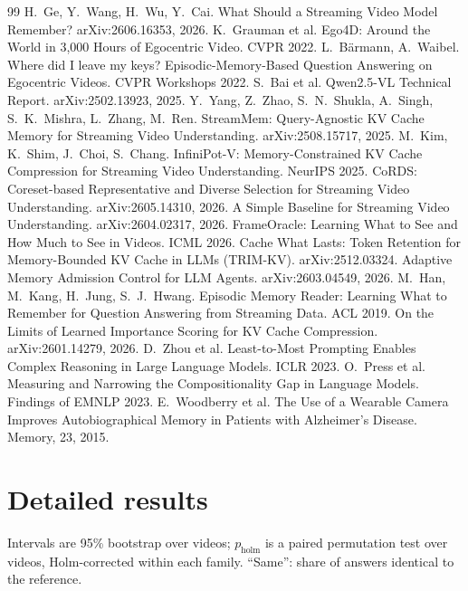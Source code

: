 \documentclass[11pt,a4paper]{article}
\begin{document}
\begin{thebibliography}{99}\small
{} H.~Ge, Y.~Wang, H.~Wu, Y.~Cai. What Should a Streaming Video Model Remember? arXiv:2606.16353, 2026.
 K.~Grauman et al. Ego4D: Around the World in 3,000 Hours of Egocentric Video. CVPR 2022.
 L.~B\"armann, A.~Waibel. Where did I leave my keys? Episodic-Memory-Based Question Answering on Egocentric Videos. CVPR Workshops 2022.
 S.~Bai et al. Qwen2.5-VL Technical Report. arXiv:2502.13923, 2025.
 Y.~Yang, Z.~Zhao, S.~N.~Shukla, A.~Singh, S.~K.~Mishra, L.~Zhang, M.~Ren. StreamMem: Query-Agnostic KV Cache Memory for Streaming Video Understanding. arXiv:2508.15717, 2025.
 M.~Kim, K.~Shim, J.~Choi, S.~Chang. InfiniPot-V: Memory-Constrained KV Cache Compression for Streaming Video Understanding. NeurIPS 2025.
 CoRDS: Coreset-based Representative and Diverse Selection for Streaming Video Understanding. arXiv:2605.14310, 2026.
 A Simple Baseline for Streaming Video Understanding. arXiv:2604.02317, 2026.
 FrameOracle: Learning What to See and How Much to See in Videos. ICML 2026.
 Cache What Lasts: Token Retention for Memory-Bounded KV Cache in LLMs (TRIM-KV). arXiv:2512.03324.
 Adaptive Memory Admission Control for LLM Agents. arXiv:2603.04549, 2026.
 M.~Han, M.~Kang, H.~Jung, S.~J.~Hwang. Episodic Memory Reader: Learning What to Remember for Question Answering from Streaming Data. ACL 2019.
 On the Limits of Learned Importance Scoring for KV Cache Compression. arXiv:2601.14279, 2026.
 D.~Zhou et al. Least-to-Most Prompting Enables Complex Reasoning in Large Language Models. ICLR 2023.
 O.~Press et al. Measuring and Narrowing the Compositionality Gap in Language Models. Findings of EMNLP 2023.
 E.~Woodberry et al. The Use of a Wearable Camera Improves Autobiographical Memory in Patients with Alzheimer's Disease. Memory, 23, 2015.
\end{thebibliography}

\clearpage
\appendix
\section{Detailed results}\label{app:tables}
Intervals are 95\% bootstrap over videos; $p_\text{holm}$ is a paired permutation test over videos, Holm-corrected within
each family. ``Same'': share of answers identical to the reference.
\end{document}
